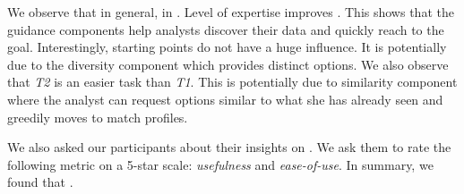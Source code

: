 We observe that in general,  in \framework. Level of expertise improves . This shows that the guidance components help analysts discover their data and quickly reach to the goal. Interestingly, starting points do not have a huge influence. It is potentially due to the diversity component which provides distinct options. We also observe that {\em T2} is an easier task than {\em T1}. This is potentially due to similarity component where the analyst can request options similar to what she has already seen and greedily moves to match profiles.

We also asked our participants about their insights on \framework. We ask them to rate the following metric on a 5-star scale: {\em usefulness} and {\em ease-of-use}. In summary, we found that .